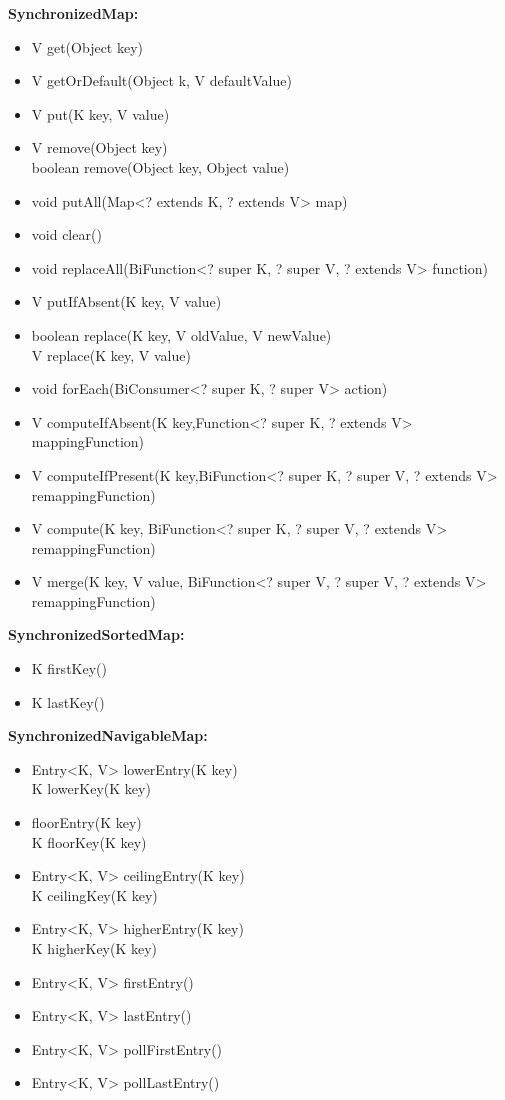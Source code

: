 \documentclass[]{usiinfthesis}
\begin{document}
{\noindent
\textbf{SynchronizedMap:}
\begin{itemize}
    \item  V get(Object key)
    \item  V getOrDefault(Object k, V defaultValue)
    \item  V put(K key, V value)
    \item  V remove(Object key)
    \mbox{}\\  boolean remove(Object key, Object value)
    \item  void putAll(Map<? extends K, ? extends V> map)
    \item  void clear()
    \item  void replaceAll(BiFunction<? super K, ? super V, ? extends V> function)
    \item  V putIfAbsent(K key, V value)
    \item  boolean replace(K key, V oldValue, V newValue)
    \mbox{}\\  V replace(K key, V value)
    \item  void forEach(BiConsumer<? super K, ? super V> action)
    \item  V computeIfAbsent(K key,Function<? super K, ? extends V> mappingFunction)
    \item  V computeIfPresent(K key,BiFunction<? super K, ? super V, ? extends V> remappingFunction)
    \item  V compute(K key, BiFunction<? super K, ? super V, ? extends V> remappingFunction)
    \item  V merge(K key, V value, BiFunction<? super V, ? super V, ? extends V> remappingFunction)
\end{itemize}

\noindent
\textbf{SynchronizedSortedMap:}
\begin{itemize}
    \item  K firstKey()
    \item  K lastKey()
\end{itemize}

\noindent
\textbf{SynchronizedNavigableMap:}
\begin{itemize}
    \item  Entry<K, V> lowerEntry(K key)
    \mbox{}\\  K lowerKey(K key)
    \item  <K, V> floorEntry(K key)
    \mbox{}\\  K floorKey(K key)
    \item  Entry<K, V> ceilingEntry(K key)
    \mbox{}\\  K ceilingKey(K key)
    \item  Entry<K, V> higherEntry(K key)
    \mbox{}\\  K higherKey(K key)
    \item  Entry<K, V> firstEntry()
    \item  Entry<K, V> lastEntry()
    \item  Entry<K, V> pollFirstEntry()
    \item  Entry<K, V> pollLastEntry()
\end{itemize}

}
\end{document}
